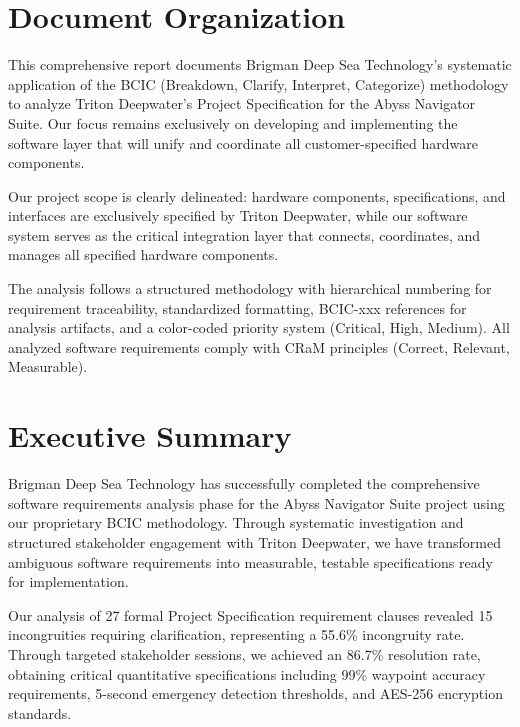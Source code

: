 \documentclass[12pt,a4paper]{article}
\begin{document}
\newpage
\setcounter{page}{3}
\section*{Document Organization}

This comprehensive report documents Brigman Deep Sea Technology's systematic application of the BCIC (Breakdown, Clarify, Interpret, Categorize) methodology to analyze Triton Deepwater's Project Specification for the Abyss Navigator Suite. Our focus remains exclusively on developing and implementing the software layer that will unify and coordinate all customer-specified hardware components.

Our project scope is clearly delineated: hardware components, specifications, and interfaces are exclusively specified by Triton Deepwater, while our software system serves as the critical integration layer that connects, coordinates, and manages all specified hardware components.

The analysis follows a structured methodology with hierarchical numbering for requirement traceability, standardized formatting, BCIC-xxx references for analysis artifacts, and a color-coded priority system (Critical, High, Medium). All analyzed software requirements comply with CRaM principles (Correct, Relevant, Measurable).

\newpage
\section{Executive Summary}
\label{sec:executive}

Brigman Deep Sea Technology has successfully completed the comprehensive software requirements analysis phase for the Abyss Navigator Suite project using our proprietary BCIC methodology. Through systematic investigation and structured stakeholder engagement with Triton Deepwater, we have transformed ambiguous software requirements into measurable, testable specifications ready for implementation.

Our analysis of 27 formal Project Specification requirement clauses revealed 15 incongruities requiring clarification, representing a 55.6\% incongruity rate. Through targeted stakeholder sessions, we achieved an 86.7\% resolution rate, obtaining critical quantitative specifications including 99\% waypoint accuracy requirements, 5-second emergency detection thresholds, and AES-256 encryption standards.
\end{document}
